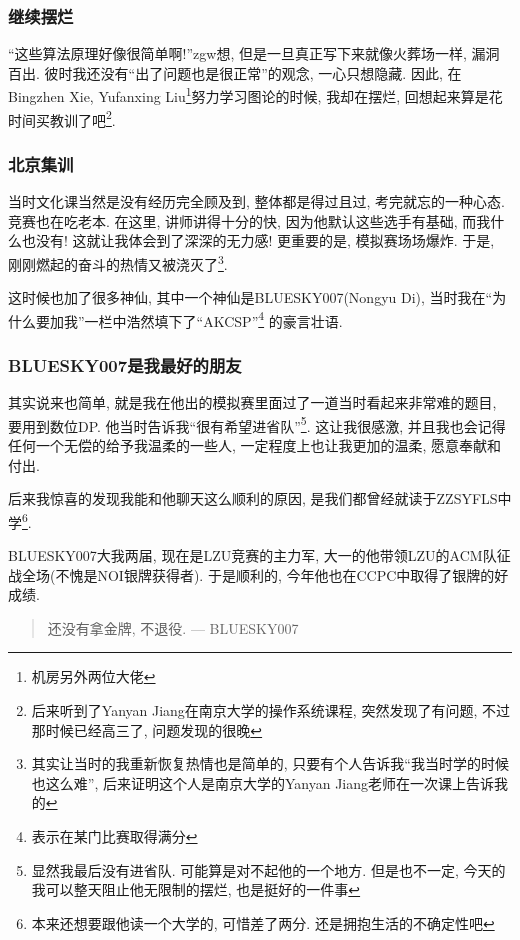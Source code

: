     \subsubsection{继续摆烂}

    ``这些算法原理好像很简单啊!''zgw想, 但是一旦真正写下来就像火葬场一样, 漏洞百出. 彼时我还没有``出了问题也是很正常''的观念, 一心只想隐藏. 因此, 在Bingzhen Xie, Yufanxing Liu\footnote{机房另外两位大佬}努力学习图论的时候, 我却在摆烂, 回想起来算是花时间买教训了吧\footnote{后来听到了Yanyan Jiang在南京大学的操作系统课程, 突然发现了有问题, 不过那时候已经高三了, 问题发现的很晚}.
    \newpage
    \subsubsection{北京集训}

    当时文化课当然是没有经历完全顾及到, 整体都是得过且过, 考完就忘的一种心态. 竞赛也在吃老本. 在这里, 讲师讲得十分的快, 因为他默认这些选手有基础, 而我什么也没有! 这就让我体会到了深深的无力感! 更重要的是, 模拟赛场场爆炸. 于是, 刚刚燃起的奋斗的热情又被浇灭了\footnote{其实让当时的我重新恢复热情也是简单的, 只要有个人告诉我``我当时学的时候也这么难'', 后来证明这个人是南京大学的Yanyan Jiang老师在一次课上告诉我的}.
    
    这时候也加了很多神仙, 其中一个神仙是BLUESKY007(Nongyu Di), 当时我在``为什么要加我''一栏中浩然填下了``AKCSP''\footnote{表示在某门比赛取得满分} 的豪言壮语. 
    
    \subsubsection{BLUESKY007是我最好的朋友}

    其实说来也简单, 就是我在他出的模拟赛里面过了一道当时看起来非常难的题目, 要用到数位DP. 他当时告诉我``很有希望进省队''\footnote{显然我最后没有进省队. 可能算是对不起他的一个地方. 但是也不一定, 今天的我可以整天阻止他无限制的摆烂, 也是挺好的一件事}. 这让我很感激, 并且我也会记得任何一个无偿的给予我温柔的一些人, 一定程度上也让我更加的温柔, 愿意奉献和付出. 

    后来我惊喜的发现我能和他聊天这么顺利的原因, 是我们都曾经就读于ZZSYFLS中学\footnote{本来还想要跟他读一个大学的, 可惜差了两分. 还是拥抱生活的不确定性吧}.

    BLUESKY007大我两届, 现在是LZU竞赛的主力军, 大一的他带领LZU的ACM队征战全场(不愧是NOI银牌获得者). 于是顺利的, 今年他也在CCPC中取得了银牌的好成绩. 

    \begin{quote}
        还没有拿金牌, 不退役. \hfill --- BLUESKY007
    \end{quote}

